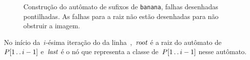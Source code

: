 \begin{figure}
{\begin{minipage}{\textwidth}
\end{minipage}
}

\caption{Construção do autômato de sufixos de \texttt{banana}, falhas desenhadas pontilhadas. As falhas para a raiz não estão desenhadas para não obstruir a imagem.}
\label{fig:bananaauto}
\end{figure}



\begin{invar}
No início da~$i$-ésima iteração do  da linha~,~$\mathit{root}$ é a raiz do autômato de~$P[1\,.\,.\, i-1]$ e~$\mathit{last}$ é o nó que representa a classe de~$P[1\,.\,.\, i-1]$ nesse autômato.
\end{invar}

